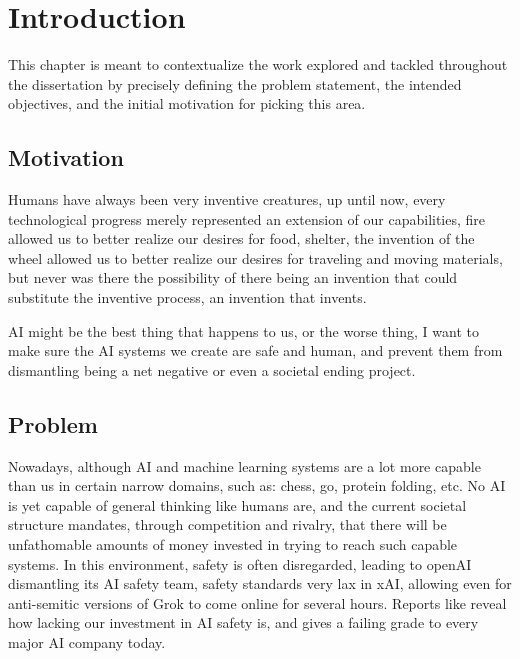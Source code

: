 \chapter{Introduction}\label{chap:introduction}

This chapter is meant to contextualize the work explored and tackled throughout the dissertation by precisely defining the problem statement, the intended objectives, and the initial motivation for picking this area.

\section{Motivation}

Humans have always been very inventive creatures, up until now, every technological progress merely represented an extension of our capabilities, fire allowed us to better realize our desires for food, shelter, the invention of the wheel allowed us to better realize our desires for traveling and moving materials, but never was there the possibility of there being an invention that could substitute the inventive process, an invention that invents. 

AI might be the best thing that happens to us, or the worse thing, I want to make sure the AI systems we create are safe and human, and prevent them from dismantling being a net negative or even a societal ending project.


\section{Problem}

Nowadays, although AI and machine learning systems are a lot more capable than us in certain narrow domains, such as: chess, go, protein folding, etc. No AI is yet capable of general thinking like humans are, and the current societal structure mandates, through competition and rivalry, that there will be unfathomable amounts of money invested in trying to reach such capable systems. In this environment, safety is often disregarded, leading to openAI dismantling its AI safety team, safety standards very lax in xAI, allowing even for anti-semitic versions of Grok to come online for several hours. Reports like \cite{IAISafetyReport2025} reveal how lacking our investment in AI safety is, and \cite{FLIAISafetyIndex2025} gives a failing grade to every major AI company today. 

